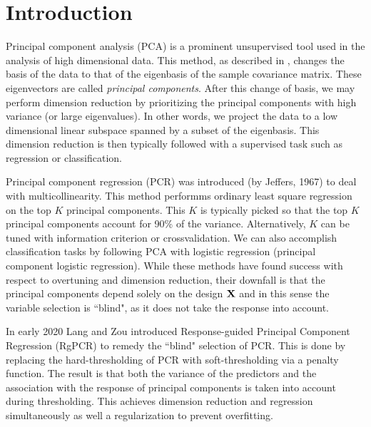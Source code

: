 \documentclass[main.tex]{subfiles}
\begin{document}
\section{Introduction}
Principal component analysis (PCA) is a prominent unsupervised tool used in the analysis of high dimensional data. This method, as described in \cite{PCA}, changes the basis of the data to that of the eigenbasis of the sample covariance matrix. These eigenvectors are called \emph{principal components}. After this change of basis, we may perform dimension reduction by prioritizing the principal components with high variance (or large eigenvalues). In other words, we project the data to a low dimensional linear subspace spanned by a subset of the eigenbasis. This dimension reduction is then typically followed with a supervised task such as regression or classification.

Principal component regression (PCR) was introduced (by Jeffers, 1967) to deal with multicollinearity. This method performms ordinary least square regression on the top $K$ principal components. This $K$ is typically picked so that the top $K$ principal components account for 90\% of the variance. Alternatively, $K$ can be tuned with information criterion or crossvalidation. We can also accomplish classification tasks by following PCA with logistic regression (principal component logistic regression). While these methods have found success with respect to overtuning and dimension reduction, their downfall is that the principal components depend solely on the design $\mathbf{X}$ and in this sense the variable selection is ``blind", as it does not take the response into account.


In early 2020 Lang and Zou \cite{langzou} introduced Response-guided Principal Component Regression (RgPCR) to remedy the ``blind" selection of PCR. This is done by replacing the hard-thresholding of PCR with soft-thresholding via a penalty function. The result is that both the variance of the predictors and the association with the response of principal components is taken into account during thresholding. This achieves dimension reduction and regression simultaneously as well a regularization to prevent overfitting.
\end{document}
